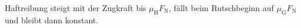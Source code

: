 Haftreibung steigt mit der Zugkraft bis $\mu_\mathrm{H}F_\mathrm{N}$, fällt beim Rutschbeginn auf $\mu_\mathrm{G}F_\mathrm{N}$ und bleibt dann konstant.
